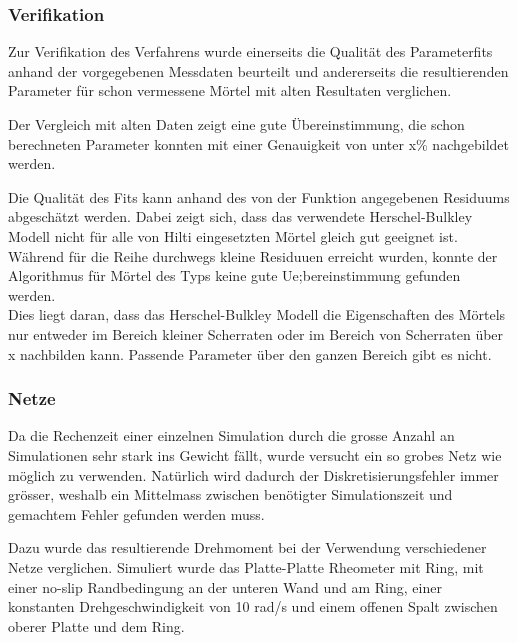 \subsubsection{Verifikation}
Zur Verifikation des Verfahrens wurde einerseits die Qualität des Parameterfits anhand der vorgegebenen Messdaten beurteilt und andererseits die resultierenden Parameter für schon vermessene Mörtel mit alten Resultaten verglichen.

Der Vergleich mit alten Daten zeigt eine gute Übereinstimmung, die schon berechneten Parameter konnten mit einer Genauigkeit von unter x\%  nachgebildet werden.

Die Qualität des Fits kann anhand des von der Funktion  angegebenen Residuums abgeschätzt werden. Dabei zeigt sich, dass das verwendete Herschel-Bulkley Modell nicht für alle von Hilti eingesetzten Mörtel gleich gut geeignet ist. Während für die \hit{} Reihe durchwegs kleine Residuuen  erreicht wurden, konnte der Algorithmus für Mörtel des \re{} Typs keine gute Ue;bereinstimmung gefunden werden.\\
Dies liegt daran, dass das Herschel-Bulkley Modell die Eigenschaften des Mörtels nur entweder im Bereich kleiner Scherraten  oder im Bereich von Scherraten über x nachbilden kann. Passende Parameter über den ganzen Bereich gibt es nicht.
%
\subsubsection{Netze}
Da die Rechenzeit einer einzelnen Simulation durch die grosse Anzahl an Simulationen sehr stark ins Gewicht fällt, wurde versucht ein so grobes Netz wie möglich zu verwenden. Natürlich wird dadurch der Diskretisierungsfehler immer grösser, weshalb ein Mittelmass zwischen benötigter Simulationszeit und gemachtem Fehler gefunden werden muss.

Dazu wurde das resultierende Drehmoment bei der Verwendung verschiedener Netze verglichen. Simuliert wurde das Platte-Platte Rheometer mit Ring, mit einer no-slip Randbedingung an der unteren Wand und am Ring, einer konstanten Drehgeschwindigkeit von 10 rad/s und einem offenen Spalt zwischen oberer Platte und dem Ring.

